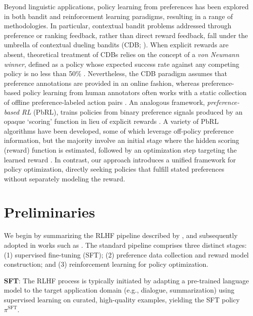 Beyond linguistic applications, policy learning from preferences has been explored in both bandit and reinforcement learning paradigms, resulting in a range of methodologies. In particular, contextual bandit problems addressed through preference or ranking feedback, rather than direct reward feedback, fall under the umbrella of contextual dueling bandits (CDB; \cite{yue2012karmed,dudik2015contextual}). When explicit rewards are absent, theoretical treatment of CDBs relies on the concept of a \textit{von Neumann winner}, defined as a policy whose expected success rate against any competing policy is no less than 50\% \citep{dudik2015contextual}. Nevertheless, the CDB paradigm assumes that preference annotations are provided in an online fashion, whereas preference-based policy learning from human annotators often works with a static collection of offline preference-labeled action pairs \citep{yan2022human}. An analogous framework, \textit{preference-based RL} (PbRL), trains policies from binary preference signals produced by an opaque `scoring' function in lieu of explicit rewards \citep{BusaFekete2014,ruiz2023dueling}. A variety of PbRL algorithms have been developed, some of which leverage off-policy preference information, but the majority involve an initial stage where the hidden scoring (reward) function is estimated, followed by an optimization step targeting the learned reward \citep{jain2013learning,BusaFekete2014,christiano2017deep,sadigh2017active,kupcsik2018learning}. In contrast, our approach introduces a unified framework for policy optimization, directly seeking policies that fulfill stated preferences without separately modeling the reward.

\section{Preliminaries}\label{section:prelims}

We begin by summarizing the RLHF pipeline described by \citeauthor{ziegler2020finetuning}, and subsequently adopted in works such as \citep{stiennon2022learning, bai2022training, ouyang2022training}. The standard pipeline comprises three distinct stages: (1) supervised fine-tuning (SFT); (2) preference data collection and reward model construction; and (3) reinforcement learning for policy optimization.

\textbf{SFT}: The RLHF process is typically initiated by adapting a pre-trained language model to the target application domain (e.g., dialogue, summarization) using supervised learning on curated, high-quality examples, yielding the SFT policy $\pi^\text{SFT}$.

